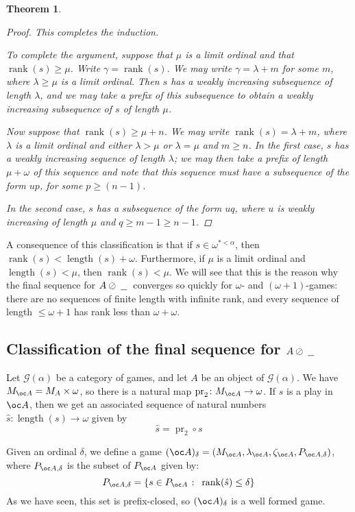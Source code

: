 \documentclass[11pt]{article} %
\theoremstyle{plain} %
\newtheorem{theorem}{Theorem}[section]
\theoremstyle{definition} %
\theoremstyle{note}
\theoremstyle{exercisestyle}
\newcommand*\from{\colon}
\DeclareMathOperator{\pr}{pr}
\newcommand{\sequoid}{\oslash}
\newcommand{\G}{\mathcal G}
\newcommand{\suchthat}{\;\colon\;}
\DeclareMathOperator{\length}{length}
\newcommand{\blank}{\;\underline{\hspace{1.5ex}}\;}
\DeclareMathOperator{\rank}{rank}
\begin{document}
\begin{theorem}
\begin{proof}
    This completes the induction.  

    To complete the argument, suppose that $\mu$ is a limit ordinal and that $\rank(s)\ge\mu$.  Write $\gamma=\rank(s)$.  We may write $\gamma=\lambda+m$ for some $m$, where $\lambda\ge\mu$ is a limit ordinal.  Then $s$ has a weakly increasing subsequence of length $\lambda$, and we may take a prefix of this subsequence to obtain a weakly increasing subsequence of $s$ of length $\mu$.  

    Now suppose that $\rank(s)\ge\mu+n$.  We may write $\rank(s) = \lambda+m$, where $\lambda$ is a limit ordinal and either $\lambda>\mu$ or $\lambda=\mu$ and $m\ge n$.  In the first case, $s$ has a weakly increasing sequence of length $\lambda$; we may then take a prefix of length $\mu+\omega$ of this sequence and note that this sequence must have a subsequence of the form $up$, for some $p\ge (n-1)$.  

    In the second case, $s$ has a subsequence of the form $uq$, where $u$ is weakly increasing of length $\mu$ and $q\ge m-1\ge n-1$.  
  \end{proof}
\end{theorem}

A consequence of this classification is that if $s\in\omega^{*<\alpha}$, then $\rank(s)<\length(s)+\omega$.  Furthermore, if $\mu$ is a limit ordinal and $\length(s)<\mu$, then $\rank(s)<\mu$.  We will see that this is the reason why the final sequence for $A\sequoid\blank$ converges so quickly for $\omega$- and $(\omega+1)$-games: there are no sequences of finite length with infinite rank, and every sequence of length $\le \omega+1$ has rank less than $\omega+\omega$.  

\subsection{Classification of the final sequence for $A\sequoid\protect\blank$}

Let $\G(\alpha)$ be a category of games, and let $A$ be an object of $\G(\alpha)$.  We have $M_{\oc A}=M_A\times\omega$, so there is a natural map $\pr_2\from M_{\oc A}\to \omega$.  If $s$ is a play in $\oc A$, then we get an associated sequence of natural numbers $\hat s\from\length(s)\to\omega$ given by\[
  \hat s = \pr_2 \circ s
  \]

Given an ordinal $\delta$, we define a game $(\oc A)_\delta=(M_{\oc A},\lambda_{\oc A}, \zeta_{\oc A}, P_{\oc A,\delta})$, where $P_{\oc A,\delta}$ is the subset of $P_{\oc A}$ given by:
\[
  P_{\oc A,\delta} = \{s\in P_{\oc A}\suchthat \rank(\hat s)\le\delta\}
  \]
As we have seen, this set is prefix-closed, so $(\oc A)_\delta$ is a well formed game.  
\end{document}
